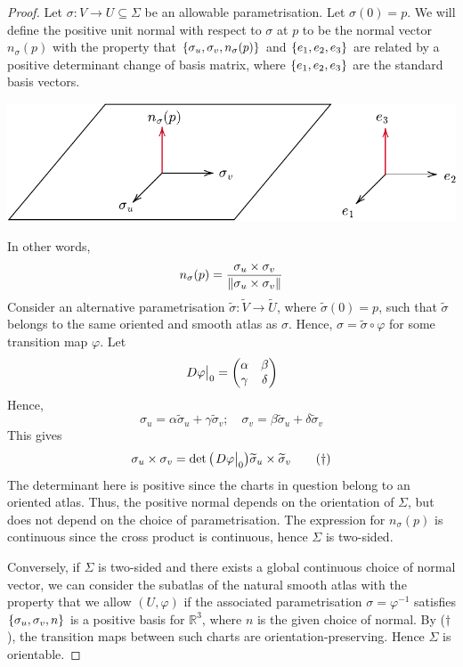 \documentclass[a4paper]{article}
\begin{document}
\begin{proof}
	Let \( \sigma \colon V \to U \subseteq \Sigma \) be an allowable parametrisation.
	Let \( \sigma(0) = p \).
	We will define the positive unit normal with respect to \( \sigma \) at \( p \) to be the normal vector \( n_\sigma(p) \) with the property that \( \qty{\sigma_u, \sigma_v, n_\sigma(p)} \) and \( \qty{e_1, e_2, e_3} \) are related by a positive determinant change of basis matrix, where \( \qty{e_1, e_2, e_3} \) are the standard basis vectors.
	\begin{center}
		\includegraphics[scale=.8]{orientable-lemma}
	\end{center}
	In other words,
	\[
		n_\sigma(p) = \frac{\sigma_u \times \sigma_v}{\norm{\sigma_u \times \sigma_v}}
	\]
	Consider an alternative parametrisation \( \widetilde \sigma \colon \widetilde V \to \widetilde U \), where \( \widetilde \sigma(0) = p \), such that \( \widetilde \sigma \) belongs to the same oriented and smooth atlas as \( \sigma \).
	Hence, \( \sigma = \widetilde \sigma \circ \varphi \) for some transition map \( \varphi \).
	Let
	\[
		{\textstyle \eval{D \varphi}_0} = \begin{pmatrix}
			\alpha & \beta  \\
			\gamma & \delta
		\end{pmatrix}
	\]
	Hence,
	\[
		\sigma_u = \alpha \widetilde \sigma_u + \gamma \widetilde \sigma_v;\quad \sigma_v = \beta \widetilde \sigma_u + \delta \widetilde \sigma_v
	\]
	This gives
	\begin{equation}
		\sigma_u \times \sigma_v = \det\qty({\textstyle \eval{D  \varphi}_0}) \widetilde \sigma_u \times \widetilde \sigma_v \tag{\(\dagger\)}
	\end{equation}
	The determinant here is positive since the charts in question belong to an oriented atlas.
	Thus, the positive normal depends on the orientation of \( \Sigma \), but does not depend on the choice of parametrisation.
	The expression for \( n_\sigma(p) \) is continuous since the cross product is continuous, hence \( \Sigma \) is two-sided.

	Conversely, if \( \Sigma \) is two-sided and there exists a global continuous choice of normal vector, we can consider the subatlas of the natural smooth atlas with the property that we allow \( (U,\varphi) \) if the associated parametrisation \( \sigma = \varphi^{-1} \) satisfies \( \qty{\sigma_u, \sigma_v, n} \) is a positive basis for \( \mathbb R^3 \), where \( n \) is the given choice of normal.
	By (\(\dagger\)), the transition maps between such charts are orientation-preserving.
	Hence \( \Sigma \) is orientable.
\end{proof}
\end{document}
